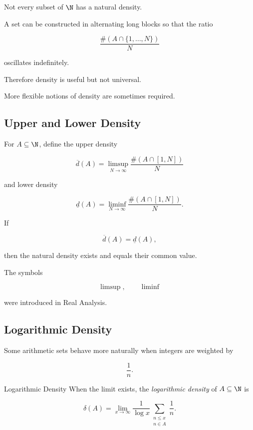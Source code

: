 Not every subset of \(\N\) has a natural density.

A set can be constructed in alternating long blocks so that the ratio

\[ \frac{\#(A\cap\{1,\ldots,N\})}{N} \]

oscillates indefinitely.

Therefore density is useful but not universal.

More flexible notions of density are sometimes required.

\subsection{Upper and Lower Density}
\label{subsec:upper-lower-density}

For \(A\subseteq\N\), define the upper density

\[ \overline d(A)=\limsup_{N\to\infty}\frac{\#(A\cap[1,N])}{N} \]

and lower density

\[ \underline d(A)=\liminf_{N\to\infty}\frac{\#(A\cap[1,N])}{N}. \]

If

\[ \overline d(A)=\underline d(A), \]

then the natural density exists and equals their common value.

The symbols

\[ \limsup,\qquad\liminf \]

were introduced in Real Analysis.

\subsection{Logarithmic Density}
\label{subsec:logarithmic-density}

Some arithmetic sets behave more naturally when integers are weighted by

\[ \frac1n. \]

\begin{definitionbox}{Logarithmic Density}
When the limit exists, the \emph{logarithmic density} of \(A\subseteq\N\) is

\[
\delta(A)
=
\lim_{x\to\infty}
\frac{1}{\log x}
\sum_{\substack{n\leq x\\n\in A}}\frac1n.
\]
\end{definitionbox}

